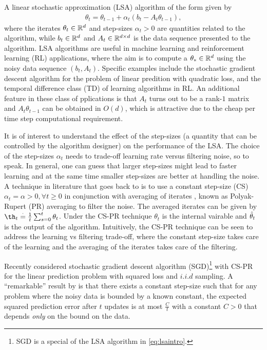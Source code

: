 A linear stochastic approximation (LSA) algorithm of the form given by
\begin{align}\label{eq:lsaintro}
\theta_t=\theta_{t-1}+\alpha_t (b_t-A_t \theta_{t-1}),
\end{align}
where the iterates $\theta_t\in \mathbb{R}^d$ and step-sizes $\alpha_t>0$ are quantities related to the algorithm, while $b_t\in \mathbb{R}^d$ and $A_t\in \mathbb{R}^{d \times d}$ is the data sequence presented to the algorithm.
LSA algorithms are useful in machine learning and reinforcement learning (RL) applications, where the aim is to compute a $\theta_*\in \mathbb{R}^d$ using the noisy data sequence $(b_t,A_t)$. Specific examples include the stochastic gradient descent algorithm for the problem of linear predition with quadratic loss, and the temporal difference class (TD) of learning algorithms in RL.
An additional feature in these class of pplications is that $A_t$ turns out to be a rank-$1$ matrix and $A_t\theta_{t-1}$ can be obtained in $O(d)$, which is attractive due to the cheap per time step computational requirement.\par
It is of interest to understand the effect of the step-sizes (a quantity that can be controlled by the algorithm designer) on the performance of the LSA. The choice of the step-sizes $\alpha_t$ needs to trade-off learning rate versus filtering noise, so to speak. In general, one can guess that larger step-sizes might lead to faster learning and at the same time smaller step-sizes are better at handling the noise. A technique in literature that goes back to \cite{polyak,ruppert} is to use a constant step-size (CS) $\alpha_t=\alpha>0,\forall t\geq 0$  in conjunction with averaging of iterates , known as Polyak-Rupert (PR) averaging to filter the noise. The averaged iterates can be given by $\th_t\eqdef\frac{1}{t}\sum_{s=0}^t \theta_t$. Under the CS-PR technique $\theta_t$ is the internal vairable and $\hat{\theta}_t$ is the output of the algorithm. Intuitively, the CS-PR technique can be seen to address the learning vs filtering trade-off, where the constant step-size takes care of the learning  and the averaging of the iterates takes care of the filtering. \par
Recently \cite{bach} considered stochastic gradient descent algorithm (SGD)\footnote{SGD is a special of the LSA algorithm in \eqref{eq:lsaintro}.} with CS-PR for the linear prediction problem with squared loss and $i.i.d$ sampling. A ``remarkable'' result by \cite{bach} is that there exists a constant step-size such that for any problem where the noisy data is bounded by a known constant, the expected squared prediction error after $t$ updates is at most $\frac{C}{t}$ with a constant $C>0$ that depends \emph{only} on the bound on the data.
